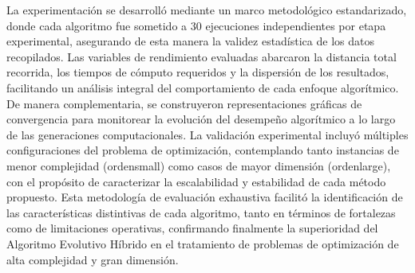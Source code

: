 \documentclass[conference]{IEEEtran}
\begin{document}
La experimentación se desarrolló mediante un marco metodológico estandarizado, donde cada algoritmo fue sometido a 30 ejecuciones independientes por etapa experimental, asegurando de esta manera la validez estadística de los datos recopilados. Las variables de rendimiento evaluadas abarcaron la distancia total recorrida, los tiempos de cómputo requeridos y la dispersión de los resultados, facilitando un análisis integral del comportamiento de cada enfoque algorítmico.
De manera complementaria, se construyeron representaciones gráficas de convergencia para monitorear la evolución del desempeño algorítmico a lo largo de las generaciones computacionales. La validación experimental incluyó múltiples configuraciones del problema de optimización, contemplando tanto instancias de menor complejidad (ordensmall) como casos de mayor dimensión (ordenlarge), con el propósito de caracterizar la escalabilidad y estabilidad de cada método propuesto.
Esta metodología de evaluación exhaustiva facilitó la identificación de las características distintivas de cada algoritmo, tanto en términos de fortalezas como de limitaciones operativas, confirmando finalmente la superioridad del Algoritmo Evolutivo Híbrido en el tratamiento de problemas de optimización de alta complejidad y gran dimensión.
\end{document}
